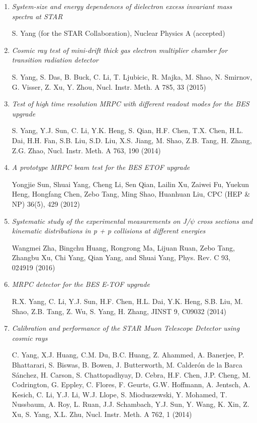 \begin{enumerate}

\item {\it System-size and energy dependences of dielectron excess invariant mass spectra at STAR}

S. Yang (for the STAR Collaboration),  Nuclear Physics A (accepted)
 
\item {\it Cosmic ray test of mini-drift thick gas electron multiplier chamber for transition radiation detector}

S. Yang, S. Das, B. Buck, C. Li, T. Ljubicic, R. Majka, M. Shao, N. Smirnov, G. Visser, Z. Xu, Y. Zhou, Nucl. Instr. Meth. A 785, 33 (2015)

\item {\it Test of high time resolution MRPC with different readout modes for the BES\uppercase\expandafter{} upgrade}

S. Yang, Y.J. Sun, C. Li, Y.K. Heng, S. Qian, H.F. Chen, T.X. Chen, H.L. Dai, H.H. Fan, S.B. Liu, S.D. Liu, X.S. Jiang, M. Shao, Z.B. Tang, H. Zhang, Z.G. Zhao, Nucl. Instr. Meth. A 763, 190 (2014)

\item {\it A prototype MRPC beam test for the BES\uppercase\expandafter{} ETOF upgrade}

Yongjie Sun, Shuai Yang, Cheng Li, Sen Qian, Lailin Xu, Zaiwei Fu, Yuekun Heng, Hongfang Chen, Zebo Tang, Ming Shao, Huanhuan Liu, CPC (HEP \& NP) 36(5), 429 (2012)

\item {\it Systematic study of the experimental measurements on J/$\psi$ cross sections and kinematic distributions in p + p collisions at different energies}

Wangmei Zha, Bingchu Huang, Rongrong Ma, Lijuan Ruan, Zebo Tang, Zhangbu Xu, Chi Yang, Qian Yang, and Shuai Yang, Phys. Rev. C 93, 024919 (2016)

\item {\it MRPC detector for the BES\uppercase\expandafter{} E-TOF upgrade}

R.X. Yang, C. Li, Y.J. Sun, H.F. Chen, H.L. Dai, Y.K. Heng, S.B. Liu, M. Shao, Z.B. Tang, Z. Wu, S. Yang, H. Zhang, JINST 9, C09032 (2014)

\item {\it Calibration and performance of the STAR Muon Telescope Detector using cosmic rays}

C. Yang, X.J. Huang, C.M. Du, B.C. Huang, Z. Ahammed, A. Banerjee, P. Bhattarari, S. Biswas, B. Bowen, J. Butterworth, M. Calderón de la Barca Sánchez, H. Carson, S. Chattopadhyay, D. Cebra, H.F. Chen, J.P. Cheng, M. Codrington, G. Eppley, C. Flores, F. Geurts, G.W. Hoffmann, A. Jentsch, A. Kesich, C. Li, Y.J. Li, W.J. Llope, S. Mioduszewski, Y. Mohamed, T. Nussbaum, A. Roy, L. Ruan, J.J. Schambach, Y.J. Sun, Y. Wang, K. Xin, Z. Xu, S. Yang, X.L. Zhu, Nucl. Instr. Meth. A 762, 1 (2014)


\end{enumerate}

